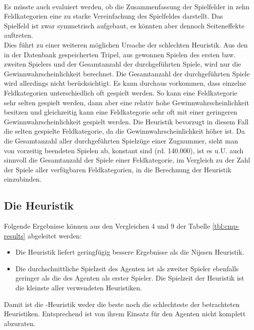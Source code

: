{\color{red}
\\Es müsste auch evaluiert werden, ob die Zusammenfassung der Spielfelder in zehn Feldkategorien eine zu starke Vereinfachung des Spielfeldes darstellt. Das Spielfeld ist zwar symmetrisch aufgebaut, es könnten aber dennoch Seiteneffekte auftreten.
\vspace{0.5cm}
\\Dies führt zu einer weiteren möglichen Ursache der schlechten Heuristik. Aus den in der Datenbank gespeicherten Tripel, aus gewonnen Spielen des ersten bzw. zweiten Spielers und der Gesamtanzahl der durchgeführten Spiele, wird nur die Gewinnwahrscheinlichkeit berechnet. Die Gesamtanzahl der durchgeführten Spiele wird allerdings nicht berücksichtigt. Es kann durchaus vorkommen, dass einzelne Feldkategorien unterschiedlich oft gespielt werden. So kann eine Feldkategorie sehr selten gespielt werden, dann aber eine relativ hohe Gewinnwahrscheinlichkeit besitzen und gleichzeitig kann eine Feldkategorie sehr oft mit einer geringeren Gewinnwahrscheinlichkeit gespielt werden. Die Heuristik bevorzugt in diesem Fall die selten gespielte Feldkategorie, da die Gewinnwahrscheinlichkeit höher ist. Da die Gesamtanzahl aller durchgeführten Spielzüge einer Zugnummer, sieht man von vorzeitig beendeten Spielen ab, konstant sind (rd. 140.000), ist es u.U. auch sinnvoll die Gesamtanzahl der Spiele einer Feldkategorie, im Vergleich zu der Zahl der Spiele aller verfügbaren Feldkategorien, in die Berechnung der Heuristik einzubinden. }

\subsection{Die Heuristik }
Folgende Ergebnisse können aus den Vergleichen 4 und 9 der Tabelle \ref{tbl:cmp-results} abgeleitet werden:
\begin{itemize}
\item Die Heuristik liefert geringfügig bessere Ergebnisse als die Nijssen Heuristik.
\item Die durchschnittliche Spielzeit des Agenten ist als zweiter Spieler ebenfalls geringer als die des Agenten als erster Spieler. Die Spielzeit der  Heuristik ist die kleinste aller verwendeten Heuristiken.
\end{itemize}
Damit ist die -Heuristik weder die beste noch die schlechteste der betrachteten Heuristiken. Entsprechend ist von ihrem Einsatz für den Agenten \mxZitat{\abp} nicht komplett abzuraten.

